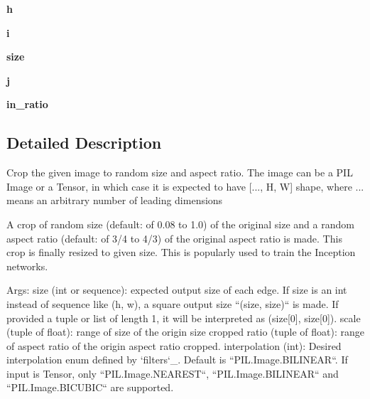 \begin{DoxyCompactItemize}
{\bfseries h}
\item 
\mbox{\label{classtorchvision_1_1transforms_1_1transforms_1_1RandomResizedCrop_a668457d9b4cb3721e0bc7e6585208ef3}} 
{\bfseries i}
\item 
\mbox{\label{classtorchvision_1_1transforms_1_1transforms_1_1RandomResizedCrop_a24533661ec71133415b20a530a472446}} 
{\bfseries size}
\item 
\mbox{\label{classtorchvision_1_1transforms_1_1transforms_1_1RandomResizedCrop_a7fcb4d0eb5e62c68d849775f5df48f43}} 
{\bfseries j}
\item 
\mbox{\label{classtorchvision_1_1transforms_1_1transforms_1_1RandomResizedCrop_a283dfe783f2520e22c985c04aa926aed}} 
{\bfseries in\+\_\+ratio}
\end{DoxyCompactItemize}


\subsection{Detailed Description}
\begin{DoxyVerb}Crop the given image to random size and aspect ratio.
The image can be a PIL Image or a Tensor, in which case it is expected
to have [..., H, W] shape, where ... means an arbitrary number of leading dimensions

A crop of random size (default: of 0.08 to 1.0) of the original size and a random
aspect ratio (default: of 3/4 to 4/3) of the original aspect ratio is made. This crop
is finally resized to given size.
This is popularly used to train the Inception networks.

Args:
    size (int or sequence): expected output size of each edge. If size is an
        int instead of sequence like (h, w), a square output size ``(size, size)`` is
        made. If provided a tuple or list of length 1, it will be interpreted as (size[0], size[0]).
    scale (tuple of float): range of size of the origin size cropped
    ratio (tuple of float): range of aspect ratio of the origin aspect ratio cropped.
    interpolation (int): Desired interpolation enum defined by `filters`_.
        Default is ``PIL.Image.BILINEAR``. If input is Tensor, only ``PIL.Image.NEAREST``, ``PIL.Image.BILINEAR``
        and ``PIL.Image.BICUBIC`` are supported.
\end{DoxyVerb}
 

